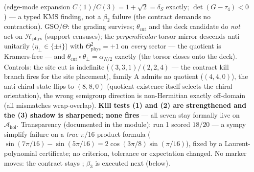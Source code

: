 (edge-mode expansion $C(1)/C(3) = 1 + \sqrt2 = \delta_S$ exactly; $\det(G - \tau_4) < 0$) ---
a typed KMS finding, not a $\beta_2$ failure (the contract demands no contraction).
GSO/$\Theta$: the grading survives; $\theta_{\mathrm{cut}}$ and the deck candidate do
\emph{not} act on $\mathcal H_{\mathrm{phys}}$ (support censuses); the \emph{perpendicular}
torsor mirror descends anti-unitarily ($\eta_\perp \in \{\pm i\}$) with
$\Theta_{\mathrm{phys}}^2 = +1$ on \emph{every} sector --- the quotient is Kramers-free ---
and $\theta_{\mathrm{cut}}\circ\theta_\perp = \alpha_{N/2}$ exactly (the torsor closes onto
the deck). Controls: the site cut is indefinite ($(3,3,1)/(2,2,4)$ --- the contract kill
branch fires for the site placement), family A admits no quotient ($(4,4,0)$), the
anti-chiral state flips to $(8,8,0)$ (quotient existence itself selects the chiral
orientation), the wrong semigroup direction is non-Hermitian exactly off-domain (all
mismatches wrap-overlap). \textbf{Kill tests (1) and (2) are strengthened and the (3) shadow
is sharpened; none fires} --- all seven stay formally live on
$\mathcal A_{\mathrm{hol}}$. Transparency (documented in the module): run 1 scored $18/20$
--- a sympy simplify failure on a \emph{true} $\pi/16$ product formula
($\sin(7\pi/16) - \sin(5\pi/16) = 2\cos(3\pi/8)\sin(\pi/16)$), fixed by a Laurent-polynomial
certificate; no criterion, tolerance or expectation changed. No marker moves: the contract
stays \mO; $\beta_3$ is executed next (below).


